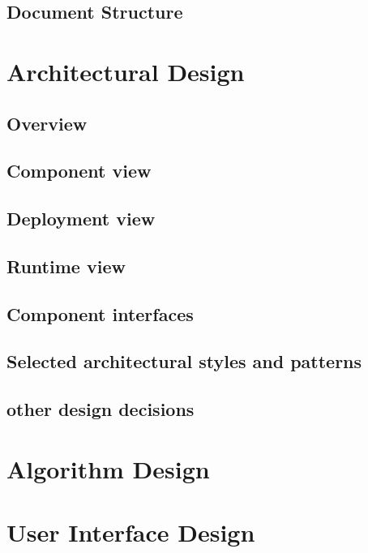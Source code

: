 \documentclass[english]{article}
\begin{document}
	\subsection{Document Structure}
\section{Architectural Design}
	\subsection{Overview}%
	\subsection{Component view}
	\subsection{Deployment view}
	\subsection{Runtime view}%
	\subsection{Component interfaces}
	\subsection{Selected architectural styles and patterns} %
	\subsection{other design decisions}
\section{Algorithm Design} %
\section{User Interface Design}%
\end{document}
